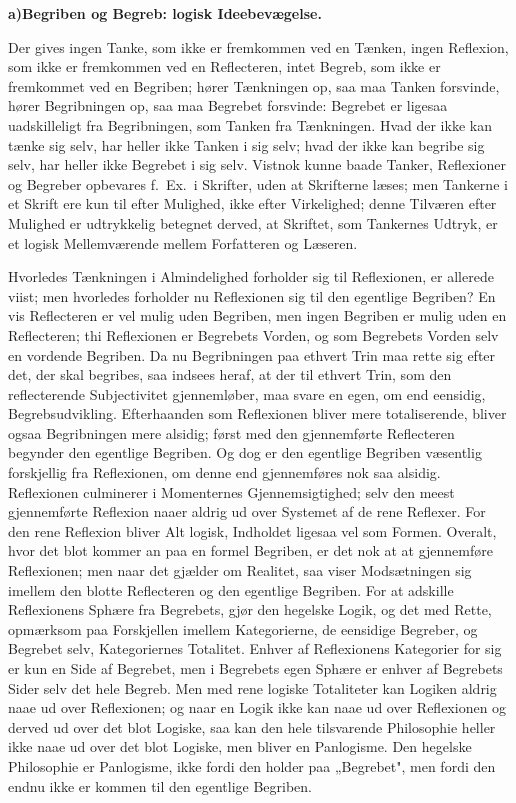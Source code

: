 \documentclass[12pt]{book}
\newcommand{\opage}[1]{\marginnote{\footnotesize\textit{[#1]}}}
\begin{document}
\begin{center}
{\bfseries a)\quad Begriben og Begreb: logisk Ideebevægelse.}
\end{center}

Der gives ingen Tanke, som ikke er fremkommen ved en Tænken, ingen Reflexion, som ikke er
fremkommen ved en Reflecteren, intet Begreb, som ikke er fremkommet ved en Begriben; hører
Tænkningen op, saa maa Tanken forsvinde, hører Begribningen op, saa maa Begrebet forsvinde:
Begrebet er ligesaa uadskilleligt fra Begribningen, som Tanken fra Tænkningen. Hvad der ikke
kan tænke sig selv, har heller ikke Tanken i sig selv; hvad der ikke kan begribe sig selv,
har heller ikke Begrebet i sig selv. Vistnok kunne baade Tanker, Reflexioner og Begreber
opbevares f.\ Ex.\ i Skrifter, uden at Skrifterne læses; men Tankerne i et Skrift ere kun til
efter Mulighed, ikke efter Virkelighed; denne Tilværen efter Mulighed er udtrykkelig betegnet
derved, at Skriftet, som Tankernes Udtryk, er et logisk Mellemværende mellem Forfatteren og
Læseren.

Hvorledes Tænkningen i Almindelighed forholder sig til Reflexionen, er allerede viist; men
hvorledes forholder nu Reflexionen sig til den egentlige Begriben? En vis Reflecteren er
\opage{144} vel mulig uden Begriben, men ingen Begriben er mulig uden en Reflecteren; thi Reflexionen er
Begrebets Vorden, og som Begrebets Vorden selv en vordende Begriben. Da nu Begribningen paa
ethvert Trin maa rette sig efter det, der skal begribes, saa indsees heraf, at der til ethvert
Trin, som den reflecterende Subjectivitet gjennemløber, maa svare en egen, om end eensidig,
Begrebsudvikling. Efterhaanden som Reflexionen bliver mere totaliserende, bliver ogsaa
Begribningen mere alsidig; først med den gjennemførte Reflecteren begynder den egentlige
Begriben. Og dog er den egentlige Begriben væsentlig forskjellig fra Reflexionen, om denne
end gjennemføres nok saa alsidig. Reflexionen culminerer i Momenternes Gjennemsigtighed; selv
den meest gjennemførte Reflexion naaer aldrig ud over Systemet af de rene Reflexer. For den
rene Reflexion bliver Alt logisk, Indholdet ligesaa vel som Formen. Overalt, hvor det blot
kommer an paa en formel Begriben, er det nok at at gjennemføre Reflexionen; men naar det
gjælder om Realitet, saa viser Modsætningen sig imellem den blotte Reflecteren og den
egentlige Begriben. For at adskille Reflexionens Sphære fra Begrebets, gjør den hegelske
Logik, og det med Rette, opmærksom paa Forskjellen imellem Kategorierne, de eensidige
Begreber, og Begrebet selv, Kategoriernes Totalitet. Enhver af Reflexionens Kategorier for
sig er kun en Side af Begrebet, men i Begrebets egen Sphære er enhver af Begrebets Sider selv
det hele Begreb. Men med rene logiske Totaliteter kan Logiken aldrig naae ud over
Reflexionen; og naar en Logik ikke kan naae ud over Reflexionen og derved ud over det blot
Logiske, saa kan den hele tilsvarende Philosophie heller ikke naae ud over det blot Logiske,
men bliver en Panlogisme. Den hegelske Philosophie er Panlogisme, ikke fordi den holder paa
„Begrebet", men fordi den endnu ikke er kommen til den egentlige Begriben.
\end{document}
